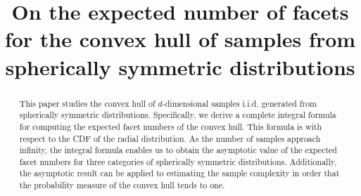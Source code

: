 \documentclass{aptpub}
\begin{document}

\title{On the expected number of facets for the convex hull of samples from spherically symmetric distributions} %






\begin{abstract}
This paper studies the convex hull of $d$-dimensional samples i.i.d. generated from spherically symmetric distributions. Specifically, we derive a complete integral formula for
computing the expected facet numbers of the convex hull.
This formula is
with respect to the CDF of the radial distribution.
 As the number of samples approach infinity,
 the integral formula enables us to obtain the asymptotic value of the expected facet numbers
 for three categories of spherically symmetric distributions.
 Additionally, the asymptotic result can be applied to estimating the sample complexity in order that
 the probability measure of the convex hull
 tends to one.
\end{abstract}



\end{document}
